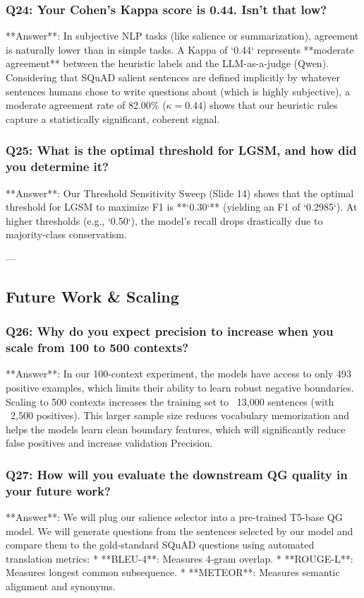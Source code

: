 \documentclass[11pt,a4paper]{article}
\begin{document}
\subsubsection{Q24: Your Cohen's Kappa score is 0.44. Isn't that low?}
**Answer**: In subjective NLP tasks (like salience or summarization), agreement is naturally lower than in simple tasks. A Kappa of `0.44` represents **moderate agreement** between the heuristic labels and the LLM-as-a-judge (Qwen). 
Considering that SQuAD salient sentences are defined implicitly by whatever sentences humans chose to write questions about (which is highly subjective), a moderate agreement rate of 82.00\% ($\kappa = 0.44$) shows that our heuristic rules capture a statistically significant, coherent signal.

\subsubsection{Q25: What is the optimal threshold for LGSM, and how did you determine it?}
**Answer**: Our Threshold Sensitivity Sweep (Slide 14) shows that the optimal threshold for LGSM to maximize F1 is **`0.30`** (yielding an F1 of `0.2985`). At higher thresholds (e.g., `0.50`), the model's recall drops drastically due to majority-class conservatism.

---

\subsection{Future Work \& Scaling}

\subsubsection{Q26: Why do you expect precision to increase when you scale from 100 to 500 contexts?}
**Answer**: In our 100-context experiment, the models have access to only 493 positive examples, which limits their ability to learn robust negative boundaries. 
Scaling to 500 contexts increases the training set to ~13,000 sentences (with ~2,500 positives). This larger sample size reduces vocabulary memorization and helps the models learn clean boundary features, which will significantly reduce false positives and increase validation Precision.

\subsubsection{Q27: How will you evaluate the downstream QG quality in your future work?}
**Answer**: We will plug our salience selector into a pre-trained T5-base QG model. We will generate questions from the sentences selected by our model and compare them to the gold-standard SQuAD questions using automated translation metrics:
* **BLEU-4**: Measures 4-gram overlap.
* **ROUGE-L**: Measures longest common subsequence.
* **METEOR**: Measures semantic alignment and synonyms.
\end{document}
